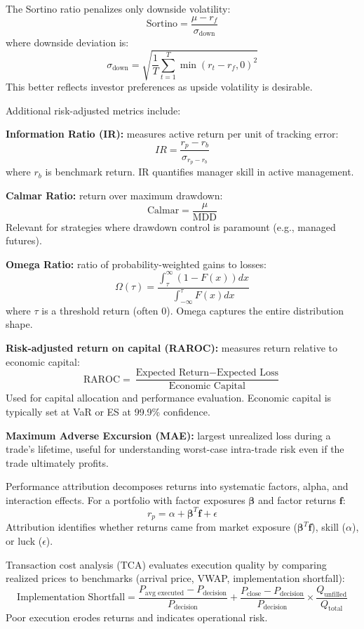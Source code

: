 \documentclass[11pt,a4paper]{article}
\begin{document}
The Sortino ratio penalizes only downside volatility:
\[
\text{Sortino} = \frac{\mu - r_f}{\sigma_{\text{down}}}
\]
where downside deviation is:
\[
\sigma_{\text{down}} = \sqrt{\frac{1}{T}\sum_{t=1}^T \min(r_t - r_f, 0)^2}
\]
This better reflects investor preferences as upside volatility is desirable.

Additional risk-adjusted metrics include:

\textbf{Information Ratio (IR):} measures active return per unit of tracking error:
\[
IR = \frac{r_p - r_b}{\sigma_{r_p - r_b}}
\]
where $r_b$ is benchmark return. IR quantifies manager skill in active management.

\textbf{Calmar Ratio:} return over maximum drawdown:
\[
\text{Calmar} = \frac{\mu}{\text{MDD}}
\]
Relevant for strategies where drawdown control is paramount (e.g., managed futures).

\textbf{Omega Ratio:} ratio of probability-weighted gains to losses:
\[
\Omega(\tau) = \frac{\int_{\tau}^{\infty}(1 - F(x))dx}{\int_{-\infty}^{\tau}F(x)dx}
\]
where $\tau$ is a threshold return (often 0). Omega captures the entire distribution shape.

\textbf{Risk-adjusted return on capital (RAROC):} measures return relative to economic capital:
\[
\text{RAROC} = \frac{\text{Expected Return} - \text{Expected Loss}}{\text{Economic Capital}}
\]
Used for capital allocation and performance evaluation. Economic capital is typically set at VaR or ES at 99.9\% confidence.

\textbf{Maximum Adverse Excursion (MAE):} largest unrealized loss during a trade's lifetime, useful for understanding worst-case intra-trade risk even if the trade ultimately profits.

Performance attribution decomposes returns into systematic factors, alpha, and interaction effects. For a portfolio with factor exposures $\boldsymbol{\beta}$ and factor returns $\mathbf{f}$:
\[
r_p = \alpha + \boldsymbol{\beta}^T\mathbf{f} + \epsilon
\]
Attribution identifies whether returns came from market exposure ($\boldsymbol{\beta}^T\mathbf{f}$), skill ($\alpha$), or luck ($\epsilon$).

Transaction cost analysis (TCA) evaluates execution quality by comparing realized prices to benchmarks (arrival price, VWAP, implementation shortfall):
\[
\text{Implementation Shortfall} = \frac{P_{\text{avg executed}} - P_{\text{decision}}}{P_{\text{decision}}} + \frac{P_{\text{close}} - P_{\text{decision}}}{P_{\text{decision}}} \times \frac{Q_{\text{unfilled}}}{Q_{\text{total}}}
\]
Poor execution erodes returns and indicates operational risk.
\end{document}
